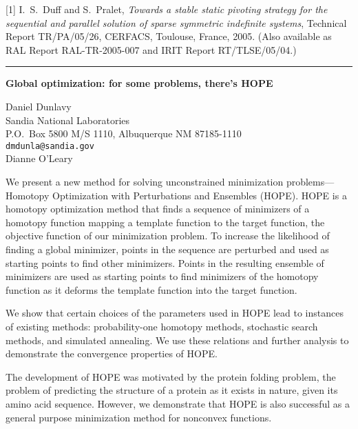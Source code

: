 \documentclass[twosided]{report}
\begin{document}
[1] I.~S.~Duff and S.~Pralet, {\em Towards a stable static
pivoting strategy for the sequential and parallel solution
of sparse symmetric indefinite systems},
{T}echnical {R}eport TR/PA/05/26, CERFACS,
Toulouse, France, 2005. (Also available as RAL Report
RAL-TR-2005-007 and IRIT Report RT/TLSE/05/04.)



	\begin{center} \rule{6in}{1pt} \end{center}

\begin{center}
{\large			%
{\bf Global optimization: for some problems, there's HOPE}}

	Daniel Dunlavy \\
	Sandia National Laboratories \\
	P.O.~Box 5800 M/S 1110, Albuquerque NM 87185-1110 \\
	{\tt dmdunla@sandia.gov} \\
	Dianne O'Leary
\end{center}
We present a new method for solving unconstrained
minimization problems---Homotopy Optimization with
Perturbations and Ensembles (HOPE). HOPE is a homotopy
optimization method that finds a sequence of minimizers of a
homotopy function mapping a template function to the target
function, the objective function of our minimization
problem. To increase the likelihood of finding a global
minimizer, points in the sequence are perturbed and used as
starting points to find other minimizers. Points in the
resulting ensemble of minimizers are used as starting points
to find minimizers of the homotopy function as it deforms
the template function into the target function.

We show
that certain choices of the parameters used in HOPE lead to
instances of existing methods: probability-one homotopy
methods, stochastic search methods, and simulated annealing.
We use these relations and further analysis to demonstrate
the convergence properties of HOPE.

The development of
HOPE was motivated by the protein folding problem, the
problem of predicting the structure of a protein as it
exists in nature, given its amino acid sequence. However, we
demonstrate that HOPE is also successful as a general
purpose minimization method for nonconvex functions.
\end{document}
